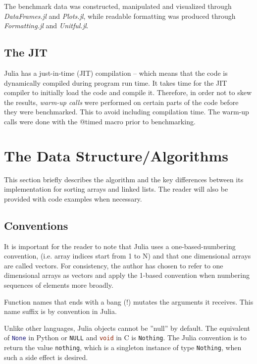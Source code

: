 \documentclass[a4paper, 11pt]{article}
\begin{document}
    The benchmark data was constructed, manipulated and visualized through
    \emph{DataFrames.jl} and \emph{Plots.jl}, 
    while readable formatting was produced through 
    \emph{Formatting.jl} and \emph{Unitful.jl}. 

    \subsection*{The JIT}
    Julia has a just-in-time (JIT) compilation -- which means that the code is
    dynamically compiled during program run time.     
    It takes time for the JIT compiler to 
    initially load the code and compile it. Therefore, in order not to skew the
    results, \emph{warm-up calls} were performed on certain parts of the code
    before they were benchmarked. This to avoid including 
    compilation time. The warm-up calls were done with the @timed macro prior to
    benchmarking.

    \section*{The Data Structure/Algorithms} %
    This section briefly describes the algorithm 
    and the key differences between its implementation for sorting arrays 
    and linked lists. The reader will also be provided with 
    code examples when necessary.

    \subsection*{Conventions}
    It is important for the reader to note that Julia uses a one-based-numbering
    convention, (i.e. array indices start from 1 to N) and that one dimensional
    arrays are called vectors. 
    For consistency, the author has chosen to refer to one dimensional
    arrays as vectors and apply the 1-based convention when numbering
    sequences of elements more broadly. 

    Function names that ends with a bang (!) mutates the arguments it receives. 
    This name suffix is by convention in Julia. 
    
    Unlike other languages, Julia objects cannot be ''null'' by default. The
    equivalent of \lstinline[language=Python]{None} in Python or
    \lstinline[language=C]{NULL} and \lstinline[language=C]{void} in C is
    \texttt{Nothing}. The Julia convention is to return the value
    \texttt{nothing}, which is a singleton instance of type
    \texttt{Nothing}, when such a side effect is
    desired. 
\end{document}
